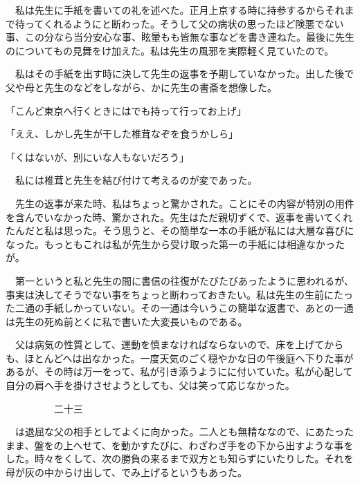 \documentclass[a4j,onecolumn]{tarticle}
\begin{document}
　私は先生に手紙を書いての礼を述べた。\hbox{}正月上京する時に持参するからそれまで待ってくれるようにと断わった。\hbox{}そうして父の病状の思ったほど険悪でない事、\hbox{}この分なら当分安心な事、\hbox{}眩暈もも皆無な事などを書き連ねた。\hbox{}最後に先生のについてもの見舞をけ加えた。\hbox{}私は先生の風邪を実際軽く見ていたので。\hbox{}\par{}
　私はその手紙を出す時に決して先生の返事を予期していなかった。\hbox{}出した後で父や母と先生のなどをしながら、\hbox{}かに先生の書斎を想像した。\hbox{}\par{}
「こんど東京へ行くときにはでも持って行ってお上げ」\par{}
「ええ、\hbox{}しかし先生が干した椎茸なぞを食うかしら」\par{}
「くはないが、\hbox{}別にいな人もないだろう」\par{}
　私には椎茸と先生を結び付けて考えるのが変であった。\hbox{}\par{}
　先生の返事が来た時、\hbox{}私はちょっと驚かされた。\hbox{}ことにその内容が特別の用件を含んでいなかった時、\hbox{}驚かされた。\hbox{}先生はただ親切ずくで、\hbox{}返事を書いてくれたんだと私は思った。\hbox{}そう思うと、\hbox{}その簡単な一本の手紙が私には大層な喜びになった。\hbox{}もっともこれは私が先生から受け取った第一の手紙には相違なかったが。\hbox{}\par{}
　第一というと私と先生の間に書信の往復がたびたびあったように思われるが、\hbox{}事実は決してそうでない事をちょっと断わっておきたい。\hbox{}私は先生の生前にたった二通の手紙しかっていない。\hbox{}その一通は今いうこの簡単な返書で、\hbox{}あとの一通は先生の死ぬ前とくに私で書いた大変長いものである。\hbox{}\par{}
　父は病気の性質として、\hbox{}運動を慎まなければならないので、\hbox{}床を上げてからも、\hbox{}ほとんどへは出なかった。\hbox{}一度天気のごく穏やかな日の午後庭へ下りた事があるが、\hbox{}その時は万一をって、\hbox{}私が引き添うようにに付いていた。\hbox{}私が心配して自分の肩へ手を掛けさせようとしても、\hbox{}父は笑って応じなかった。\hbox{}\par{}\par{}　　　　　二十三
\par{}
　は退屈な父の相手としてよくに向かった。\hbox{}二人とも無精ななので、\hbox{}にあたったまま、\hbox{}盤をの上へせて、\hbox{}を動かすたびに、\hbox{}わざわざ手をの下から出すような事をした。\hbox{}時々をくして、\hbox{}次の勝負の来るまで双方とも知らずにいたりした。\hbox{}それを母が灰の中からけ出して、\hbox{}でみ上げるというもあった。\hbox{}\par{}
\end{document}
